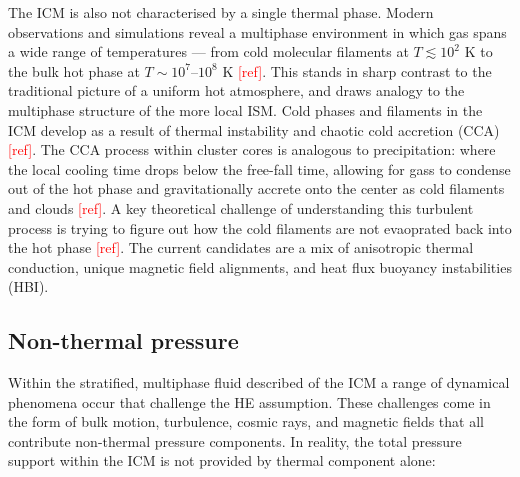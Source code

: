 The ICM is also not characterised by a single thermal phase. Modern observations and simulations reveal a multiphase environment in which gas spans a wide range of temperatures — from cold molecular filaments at $T \lesssim 10^2$ K to the bulk hot phase at $T \sim 10^{7}$--$10^{8}$ K \textcolor{red}{[ref]}. This stands in sharp contrast to the traditional picture of a uniform hot atmosphere, and draws analogy to the multiphase structure of the more local ISM.
\pbreak
Cold phases and filaments in the ICM develop as a result of thermal instability and chaotic cold accretion (CCA) \textcolor{red}{[ref]}. The CCA process within cluster cores is analogous to precipitation: where the local cooling time drops below the free-fall time, allowing for gass to condense out of the hot phase and gravitationally accrete onto the center as cold filaments and clouds \textcolor{red}{[ref]}. A key theoretical challenge of understanding this turbulent process is trying to figure out how the cold filaments are not evaoprated back into the hot phase \textcolor{red}{[ref]}. The current candidates are a mix of anisotropic thermal conduction, unique magnetic field alignments, and heat flux buoyancy instabilities (HBI).

\subsection{Non-thermal pressure}
Within the stratified, multiphase fluid described of the ICM a range of dynamical phenomena occur that challenge the HE assumption. These challenges come in the form of bulk motion, turbulence, cosmic rays, and magnetic fields that all contribute non-thermal pressure components. In reality, the total pressure support within the ICM is not provided by thermal component alone:

